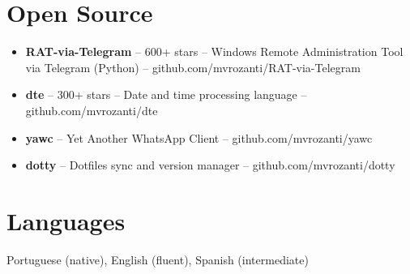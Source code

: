 \documentclass[11pt,a4paper]{article}
\begin{document}
\section{Open Source}
\begin{itemize}
\item \textbf{RAT-via-Telegram} -- 600+ stars -- Windows Remote Administration Tool via Telegram (Python) -- github.com/mvrozanti/RAT-via-Telegram
\item \textbf{dte} -- 300+ stars -- Date and time processing language -- github.com/mvrozanti/dte
\item \textbf{yawc} -- Yet Another WhatsApp Client -- github.com/mvrozanti/yawc
\item \textbf{dotty} -- Dotfiles sync and version manager -- github.com/mvrozanti/dotty
\end{itemize}

\section{Languages}
Portuguese (native), English (fluent), Spanish (intermediate)
\end{document}
